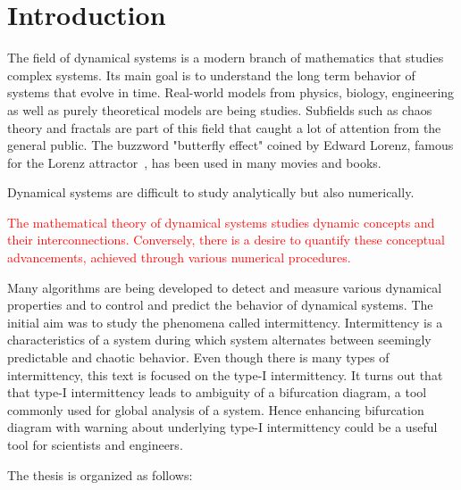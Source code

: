 \chapter{Introduction}
\label{sec:Introduction}

The field of dynamical systems is a modern branch of mathematics that studies complex systems.
Its main goal is to understand the long term behavior of systems that evolve in time.
Real-world models from physics, biology, engineering as well as purely theoretical models are being studies.
Subfields such as chaos theory and fractals are part of this field that caught a lot of attention from the general public.
The buzzword "butterfly effect" coined by Edward Lorenz, famous for the Lorenz attractor~\cite{Lorenz2004}, has been used in many movies and books.
\par
Dynamical systems are difficult to study analytically but also numerically.

\textcolor{red}{
The mathematical theory of dynamical systems studies dynamic concepts and their interconnections.
Conversely, there is a desire to quantify these conceptual advancements, achieved through various numerical procedures.
}


Many algorithms are being developed to detect and measure various dynamical properties and to control and predict the behavior of dynamical systems.
The initial aim was to study the phenomena called intermittency.
Intermittency is a characteristics of a system during which system alternates between seemingly predictable and chaotic behavior.
Even though there is many types of intermittency, this text is focused on the type-I intermittency.
It turns out that that type-I intermittency leads to ambiguity of a bifurcation diagram, a tool commonly used for global analysis of a system.
Hence enhancing bifurcation diagram with warning about underlying type-I intermittency could be a useful tool for scientists and engineers.

\bigskip

The thesis is organized as follows:



\endinput